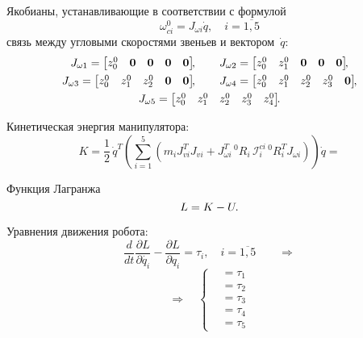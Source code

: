 Якобианы, устанавливающие в соответствии с формулой
\begin{equation}
    \omega^0_{ci} = J_{\omega i}\dot{q}, \quad i = \overline{1,5}
\end{equation}
связь между угловыми скоростями звеньев и вектором~$\dot{q}$:
\begin{gather}
    J_{\omega 1} =
    \begin{bmatrix}
        z^0_0 & \nv & \nv & \nv & \nv
    \end{bmatrix}\!\!,
    \qquad
    J_{\omega 2} =
    \begin{bmatrix}
        z^0_0 & z^0_1 & \nv & \nv & \nv
    \end{bmatrix}\!\!,
    \\
    J_{\omega 3} =
    \begin{bmatrix}
         z^0_0 & z^0_1 & z^0_2 & \nv & \nv
    \end{bmatrix}\!\!,
    \qquad
    J_{\omega 4} =
    \begin{bmatrix}
        z^0_0 & z^0_1 & z^0_2 & z^0_3 & \nv
    \end{bmatrix}\!\!,
    \\
    J_{\omega 5} =
    \begin{bmatrix}
        z^0_0 & z^0_1 & z^0_2 & z^0_3 & z^0_4
    \end{bmatrix}\!\!\ldotp
\end{gather}

Кинетическая энергия манипулятора:
\begin{equation}
    K = \frac{1}{2}\, \dot{q}^T \left( \sum_{i=1}^5 \left( m_i J_{vi}^T J_{vi} + J_{\omega i}^T \, {}^0\!R_i \, \mathcal{I}^{ci}_i \, {}^0\!R_i^T J_{\omega i} \right) \right) \dot{q} =
\end{equation}

Функция Лагранжа
\begin{equation}
    L = K - U\ldotp
\end{equation}

Уравнения движения робота:
\begin{equation}
    \frac{d}{dt}\frac{\partial L}{\partial\dot{q_i}} - \frac{\partial L}{\partial q_i} = \tau_i, \quad i = \overline{1,5} \qquad \Rightarrow
\end{equation}
\begin{equation}\label{eq_system_of_equations_1}
    \Rightarrow \quad
	\left\{
	\begin{aligned}
		\!& = \tau_1\\
		\!& = \tau_2\\
		\!& = \tau_3\\
		\!& = \tau_4\\
		\!& = \tau_5
	\end{aligned}
	\right.
\end{equation}

